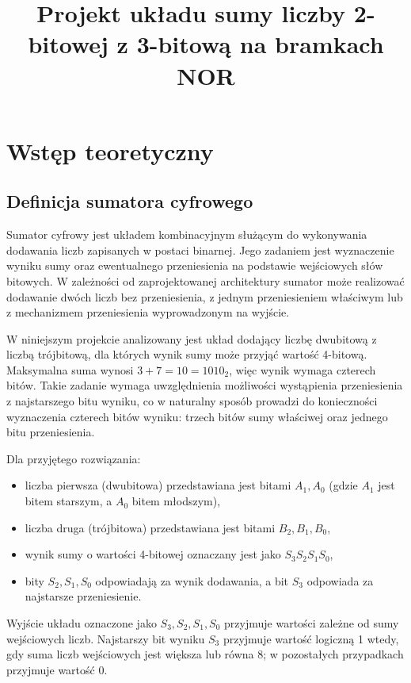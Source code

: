 \documentclass[11pt]{article}
\title{Projekt układu sumy liczby 2-bitowej z 3-bitową na bramkach NOR}
\author{}
\date{}
\begin{document}
\maketitle

\section{Wstęp teoretyczny}

\subsection{Definicja sumatora cyfrowego}

Sumator cyfrowy jest układem kombinacyjnym służącym do wykonywania dodawania liczb zapisanych w postaci binarnej. Jego zadaniem jest wyznaczenie wyniku sumy oraz ewentualnego przeniesienia na podstawie wejściowych słów bitowych. W zależności od zaprojektowanej architektury sumator może realizować dodawanie dwóch liczb bez przeniesienia, z jednym przeniesieniem właściwym lub z mechanizmem przeniesienia wyprowadzonym na wyjście.

W niniejszym projekcie analizowany jest układ dodający liczbę dwubitową z liczbą trójbitową, dla których wynik sumy może przyjąć wartość 4-bitową. Maksymalna suma wynosi \(3 + 7 = 10 = 1010_2\), więc wynik wymaga czterech bitów. Takie zadanie wymaga uwzględnienia możliwości wystąpienia przeniesienia z najstarszego bitu wyniku, co w naturalny sposób prowadzi do konieczności wyznaczenia czterech bitów wyniku: trzech bitów sumy właściwej oraz jednego bitu przeniesienia.

Dla przyjętego rozwiązania:
\begin{itemize}
    \item liczba pierwsza (dwubitowa) przedstawiana jest bitami \(A_1, A_0\) (gdzie \(A_1\) jest bitem starszym, a \(A_0\) bitem młodszym),
    \item liczba druga (trójbitowa) przedstawiana jest bitami \(B_2, B_1, B_0\),
    \item wynik sumy o wartości 4-bitowej oznaczany jest jako \(S_3 S_2 S_1 S_0\),
    \item bity \(S_2, S_1, S_0\) odpowiadają za wynik dodawania, a bit \(S_3\) odpowiada za najstarsze przeniesienie.
\end{itemize}

Wyjście układu oznaczone jako \(S_3, S_2, S_1, S_0\) przyjmuje wartości zależne od sumy wejściowych liczb. Najstarszy bit wyniku \(S_3\) przyjmuje wartość logiczną 1 wtedy, gdy suma liczb wejściowych jest większa lub równa 8; w pozostałych przypadkach przyjmuje wartość 0.
\end{document}
